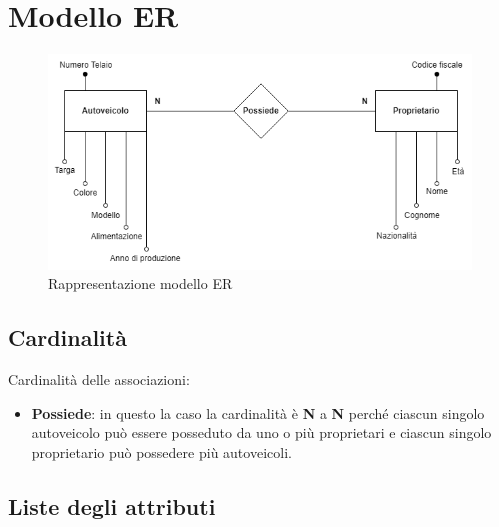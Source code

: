 \documentclass[12pt]{article}
\begin{document}
\clearpage


\section{Modello ER}

\begin{center}
    \begin{figure}[h!]
    \includegraphics[width=14cm]{modello_er_autoveicolo.png}
    \caption{Rappresentazione modello ER}
    \label{fig: Modello ER}
\end{figure}
\end{center}


\subsection{Cardinalità}
\noindent
Cardinalità delle associazioni:

\begin{itemize}
    \item \textbf{Possiede}: in questo la caso la cardinalità è \textbf{N} a \textbf{N} perché ciascun singolo autoveicolo può essere posseduto da uno o più proprietari e ciascun singolo proprietario può possedere più autoveicoli.
\end{itemize}

\clearpage 


\begin{center}
    \section{Liste degli attributi}
\end{center}
\end{document}
